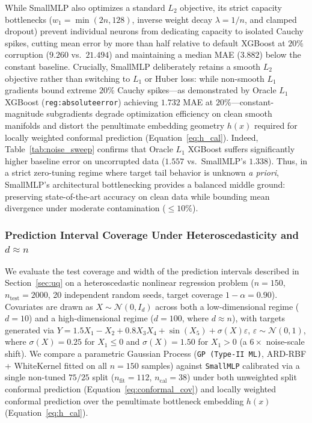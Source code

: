 \documentclass{article}
\begin{document}
While SmallMLP also optimizes a standard $L_2$ objective, its strict capacity bottlenecks ($w_1 = \min(2n, 128)$, inverse weight decay $\lambda = 1/n$, and clamped dropout) prevent individual neurons from dedicating capacity to isolated Cauchy spikes, cutting mean error by more than half relative to default XGBoost at $20\%$ corruption ($9.260$ vs.\ $21.494$) and maintaining a median MAE ($3.882$) below the constant baseline. Crucially, SmallMLP deliberately retains a smooth $L_2$ objective rather than switching to $L_1$ or Huber loss: while non-smooth $L_1$ gradients bound extreme $20\%$ Cauchy spikes—as demonstrated by Oracle $L_1$ XGBoost (\texttt{reg:absoluteerror}) achieving $1.732$ MAE at $20\%$—constant-magnitude subgradients degrade optimization efficiency on clean smooth manifolds and distort the penultimate embedding geometry $h(x)$ required for locally weighted conformal prediction (Equation~\ref{eq:h_cal}). Indeed, Table~\ref{tab:noise_sweep} confirms that Oracle $L_1$ XGBoost suffers significantly higher baseline error on uncorrupted data ($1.557$ vs.\ SmallMLP's $1.338$). Thus, in a strict zero-tuning regime where target tail behavior is unknown \textit{a priori}, SmallMLP's architectural bottlenecking provides a balanced middle ground: preserving state-of-the-art accuracy on clean data while bounding mean divergence under moderate contamination ($\le 10\%$).

\subsubsection{Prediction Interval Coverage Under Heteroscedasticity and $d \approx n$}
\label{sec:conformal_uq}

We evaluate the test coverage and width of the prediction intervals described in Section~\ref{sec:uq} on a heteroscedastic nonlinear regression problem ($n = 150$, $n_{\text{test}} = 2000$, 20 independent random seeds, target coverage $1 - \alpha = 0.90$). Covariates are drawn as $X \sim \mathcal{N}(0, I_d)$ across both a low-dimensional regime ($d = 10$) and a high-dimensional regime ($d = 100$, where $d \approx n$), with targets generated via $Y = 1.5 X_1 - X_2 + 0.8 X_3 X_4 + \sin(X_5) + \sigma(X)\varepsilon$, $\varepsilon \sim \mathcal{N}(0, 1)$, where $\sigma(X) = 0.25$ for $X_1 \le 0$ and $\sigma(X) = 1.50$ for $X_1 > 0$ (a $6\times$ noise-scale shift). We compare a parametric Gaussian Process (\texttt{GP (Type-II ML)}, ARD-RBF + WhiteKernel fitted on all $n = 150$ samples) against \texttt{SmallMLP} calibrated via a single non-tuned $75/25$ split ($n_{\text{fit}} = 112$, $n_{\text{cal}} = 38$) under both unweighted split conformal prediction (Equation~\eqref{eq:conformal_cov}) and locally weighted conformal prediction over the penultimate bottleneck embedding $h(x)$ (Equation~\eqref{eq:h_cal}).
\end{document}
